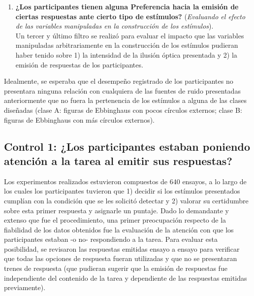 \begin{enumerate}
\item \textbf{¿Los participantes tienen alguna Preferencia hacia la emisión de ciertas respuestas ante cierto tipo de estímulos?} (\textit{Evaluando el efecto de las variables manipuladas en la construcción de los estímulos}).\\

Un tercer y último filtro se realizó para evaluar el impacto que las variables manipuladas arbitrariamente en la construcción de los estímulos pudieran haber tenido sobre 1) la intensidad de la ilusión óptica presentada y 2) la emisión de respuestas de los participantes.\\

\end{enumerate}

Idealmente, se esperaba que el desempeño registrado de los participantes no presentara ninguna relación con cualquiera de las fuentes de ruido presentadas anteriormente que no fuera la pertenencia de los estímulos a alguna de las clases diseñadas (clase A: figuras de Ebbinghaus con pocos círculos externos; clase B: figuras de Ebbinghaus con más círculos externos).\\












\subsection{Control 1: ¿Los participantes estaban poniendo atención a la tarea al emitir sus respuestas?}

Los experimentos realizados estuvieron compuestos de 640 ensayos, a lo largo de los cuales los participantes tuvieron que 1) decidir si los estímulos presentados cumplían con la condición que se les solicitó detectar y 2) valorar su certidumbre sobre esta primer respuesta y asignarle un puntaje. Dado lo demandante y extenso que fue el procedimiento, una primer preocupación respecto de la fiabilidad de los datos obtenidos fue la evaluación de la atención con que los participantes estaban -o no- respondiendo a la tarea. Para evaluar esta posibilidad, se revisaron las respuestas emitidas ensayo a ensayo para verificar que todas las opciones de respuesta fueran utilizadas y que no se presentaran trenes de respuesta (que pudieran sugerir que la emisión de respuestas fue independiente del contenido de la tarea y dependiente de las respuestas emitidas previamente).\\

